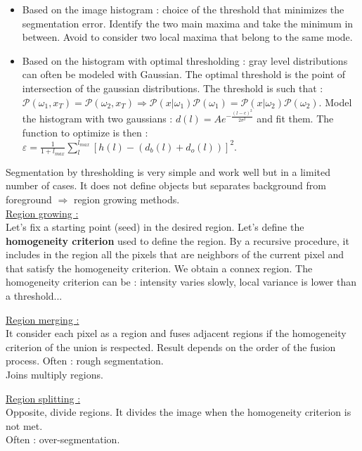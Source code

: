 \documentclass[../main.tex]{subfiles}
\begin{document}
\begin{itemize}
    \item Based on the image histogram : choice of the threshold that minimizes the segmentation error. Identify the two main maxima and take the minimum in between. \warning Avoid to consider two local maxima that belong to the same mode.
    \item Based on the histogram with optimal thresholding : gray level distributions can often be modeled with Gaussian. The optimal threshold is the point of intersection of the gaussian distributions. The threshold is such that : $\mathcal{P}(\omega_1,x_T) = \mathcal{P}(\omega_2,x_T)\Rightarrow \mathcal{P}(x\lvert \omega_1) \mathcal{P}(\omega_1) = \mathcal{P}(x\lvert \omega_2) \mathcal{P}(\omega_2)$. Model the histogram with two gaussians : $d(l) = A e^{-\frac{(l-c)^2}{2\sigma^2}}$ and fit them. The function to optimize is then : $\varepsilon = \frac{1}{1+l_{max}} \sum_l^{l_{max}} [h(l) - (d_b(l)+d_o(l))]^2$.  
\end{itemize}

Segmentation by thresholding is very simple and work well but in a limited number of cases. It does not define objects but separates background from foreground $\Rightarrow$ region growing methods.\\

\quad \underline{Region growing :}\\
Let's fix a starting point (seed) in the desired region. Let's define the \textbf{homogeneity criterion} used to define the region. By a recursive procedure, it includes in the region all the pixels that are neighbors of the current pixel and that satisfy the homogeneity criterion. We obtain a connex region. The homogeneity criterion can be : intensity varies slowly, local variance is lower than a threshold...

\quad \underline{Region merging :}\\

It consider each pixel as a region and fuses adjacent regions if the homogeneity criterion of the union is respected. \warning Result depends on the order of the fusion process. Often : rough segmentation. \\
Joins multiply regions.

\quad \underline{Region splitting :}\\
Opposite, divide regions. It divides the image when the homogeneity criterion is not met.\\
\warning Often : over-segmentation.\\
\end{document}
